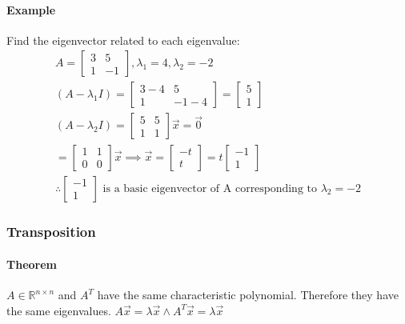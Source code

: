 \paragraph{Example}
Find the eigenvector related to each eigenvalue:
\begin{align*}
    A = \begin{bmatrix}
        3 & 5 \\
        1 & -1
    \end{bmatrix}, \lambda_1 = 4, \lambda_2 = -2\\
       (A - \lambda_1 I) = \begin{bmatrix}
        3 - 4 & 5 \\
        1 & -1 - 4
        \end{bmatrix} = \begin{bmatrix}
            5 \\
            1
        \end{bmatrix}\\
        (A - \lambda_2 I) = \begin{bmatrix}
            5 & 5 \\
            1 & 1
        \end{bmatrix} \vec{x} = \vec{0} \\
        = \begin{bmatrix}
            1 & 1 \\
            0 & 0
        \end{bmatrix}\vec{x} \implies \vec{x} = \begin{bmatrix}
            -t \\
            t
        \end{bmatrix} = t \begin{bmatrix}
            -1 \\
            1
        \end{bmatrix} \\
        \therefore \begin{bmatrix}
            -1 \\
            1
        \end{bmatrix} \text{ is a basic eigenvector of A corresponding to } \lambda_2 = -2
\end{align*}


\subsubsection*{Transposition}
\paragraph*{Theorem}
$A \in \mathbb{R}^{n\times n}$ and $A^T$ have the same characteristic polynomial.
Therefore they have the same eigenvalues. $A\vec{x} = \lambda \vec{x} \land A^T\vec{x} = \lambda \vec{x}$

